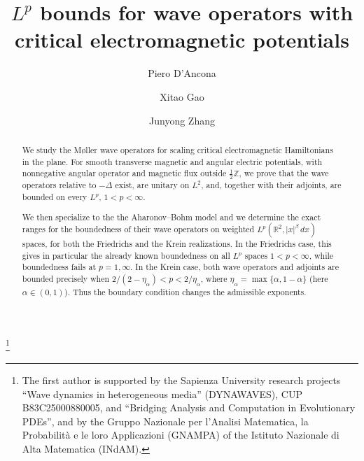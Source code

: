 \documentclass[11pt,a4paper,reqno,backref=page]{amsart}
\newcommand{\R}{\mathbb R}
\newcommand{\Z}{\mathbb Z}
\numberwithin{equation}{section}
\theoremstyle{definition}
\theoremstyle{remark}
\begin{document}
\title[$L^p$ bounds for electromagnetic wave operators]{
  $L^p$ bounds for wave operators with
  critical electromagnetic potentials}

\author{Piero D'Ancona}
\address{Piero D'Ancona:
Department of Mathematics ``Guido Castelnuovo'', Sapienza
University of Rome, Piazzale Aldo Moro 5, 00185 Rome, Italy}

\author[Xitao Gao]{Xitao Gao}
\address{Xitao Gao\newline
Department of Mathematics, Beijing Institute of Technology,
Beijing 100081, P.\,R.\ China}

\author[Junyong Zhang]{Junyong Zhang}
\address{Junyong Zhang\newline
Department of Mathematics, Beijing Institute of Technology,
Beijing 100081, P.\,R.\ China}


\thanks{The first author is supported by the Sapienza
  University research projects 
  ``Wave dynamics in heterogeneous media''
  (DYNAWAVES), CUP B83C25000880005, and ``Bridging Analysis and
  Computation in Evolutionary PDEs'', 
  and by the Gruppo Nazionale per
  l'Analisi Matematica, la Probabilit\`a e le loro 
  Applicazioni (GNAMPA)
  of the Istituto Nazionale di Alta Matematica (INdAM).}

\begin{abstract}
  We study the M\o ller wave operators for scaling critical
  electromagnetic Hamiltonians in the plane. For smooth
  transverse magnetic and angular electric potentials, with
  nonnegative angular operator and magnetic flux outside
  $\frac12\Z$, we prove that the wave operators relative to
  $-\Delta$ exist, are unitary on $L^2$, and, together with
  their adjoints, are bounded on every $L^p$, $1<p<\infty$.

  We then specialize to the the Aharonov--Bohm model
  and we determine the exact ranges for the boundedness
  of their wave operators on weighted 
  $L^p(\R^2,|x|^\beta\,dx)$ spaces,
  for both the Friedrichs and the Krein realizations.
  In the Friedrichs case, this gives in particular 
  the already known
  boundedness on all $L^{p}$ spaces $1<p<\infty$,
  while boundedness fails at $p=1,\infty$.
  In the Krein case, both wave
  operators and adjoints are bounded
  precisely when $2/(2-\eta_\alpha)<p<2/\eta_\alpha$, where
  $\eta_\alpha=\max\{\alpha,1-\alpha\}$
  (here $\alpha\in(0,1)$). Thus the boundary
  condition changes the admissible exponents.
\end{abstract}
\end{document}
